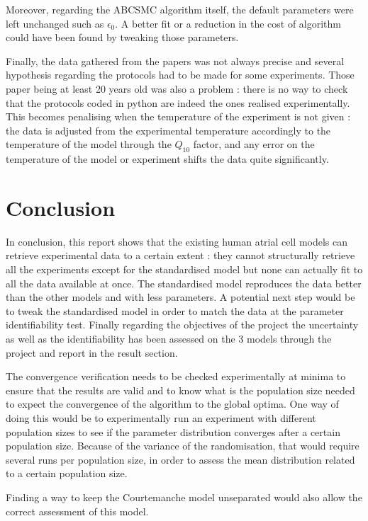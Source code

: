 \documentclass[11pt]{report}
\begin{document}
Moreover, regarding the ABCSMC algorithm itself, the default parameters were left unchanged such as $\epsilon_0$. A better fit or a reduction in the cost of algorithm could have been found by tweaking those parameters.
 
Finally, the data gathered from the papers was not always precise and several hypothesis regarding the protocols had to be made for some experiments. Those paper being at least 20 years old was also a problem : there is no way to check that the protocols coded in python are indeed the ones realised experimentally. This becomes penalising when the temperature of the experiment is not given : the data is adjusted from the experimental temperature accordingly to the temperature of the model through the $Q_{10}$ factor, and any error on the temperature of the model or experiment shifts the data quite significantly.

\section{Conclusion}

In conclusion, this report shows that the existing human atrial cell models can retrieve experimental data to a certain extent : they cannot structurally retrieve all the experiments except for the standardised model but none can actually fit to all the data available at once. The standardised model reproduces the data better than the other models and with less parameters. A potential next step would be to tweak the standardised model in order to match the data at the parameter identifiability test.
Finally regarding the objectives of the project the uncertainty as well as the identifiability has been assessed on the 3 models through the project and report in the result section. 

The convergence verification needs to be checked experimentally at minima to ensure that the results are valid and to know what is the population size needed to expect the convergence of the algorithm to the global optima. One way of doing this would be to experimentally run an experiment with different population sizes to see if the parameter distribution converges after a certain population size. Because of the variance of the randomisation, that would require several runs per population size, in order to assess the mean distribution related to a certain population size.

Finding a way to keep the Courtemanche model \cite{Courtemanche1998} unseparated would also allow the correct assessment of this model.
\end{document}
